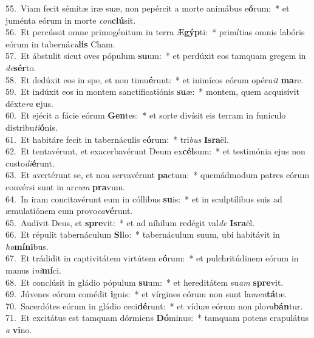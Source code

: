 {55.~}Viam fecit sémitæ iræ suæ, non pepércit a morte animábus e\textbf{ó}rum:~* et juménta eórum in morte \textit{con}\textbf{clú}sit.\\
{56.~}Et percússit omne primogénitum in terra Æ\textbf{gýp}ti:~* primítias omnis labóris eórum in taberná\textit{cu}\textbf{lis} Cham.\\
{57.~}Et ábstulit sicut oves pópulum \textbf{su}um:~* et perdúxit eos tamquam gregem in \textit{de}\textbf{sér}to.\\
{58.~}Et dedúxit eos in spe, et non timu\textbf{é}runt:~* et inimícos eórum opéru\textit{it} \textbf{ma}re.\\
{59.~}Et indúxit eos in montem sanctificatiónis \textbf{su}æ:~* montem, quem acquisívit déxte\textit{ra} \textbf{e}jus.\\
{60.~}Et ejécit a fácie eórum \textbf{Gen}tes:~* et sorte divísit eis terram in funículo distribu\textit{ti}\textbf{ó}nis.\\
{61.~}Et habitáre fecit in tabernáculis e\textbf{ó}rum:~* tri\textit{bus} \textbf{Is}\textbf{ra}ël.\\
{62.~}Et tentavérunt, et exacerbavérunt Deum ex\textbf{cél}sum:~* et testimónia ejus non custo\textit{di}\textbf{é}runt.\\
{63.~}Et avertérunt se, et non servavérunt \textbf{pa}ctum:~* quemádmodum patres eórum convérsi sunt in ar\textit{cum} \textbf{pra}vum.\\
{64.~}In iram concitavérunt eum in cóllibus \textbf{su}is:~* et in sculptílibus suis ad æmulatiónem eum provo\textit{ca}\textbf{vé}runt.\\
{65.~}Audívit Deus, et \textbf{spre}vit:~* et ad níhilum redégit val\textit{de} \textbf{Is}\textbf{ra}ël.\\
{66.~}Et répulit tabernáculum \textbf{Si}lo:~* tabernáculum suum, ubi habitávit in \textit{ho}\textbf{mí}\textbf{ni}bus.\\
{67.~}Et trádidit in captivitátem virtútem e\textbf{ó}rum:~* et pulchritúdinem eórum in manus i\textit{ni}\textbf{mí}ci.\\
{68.~}Et conclúsit in gládio pópulum \textbf{su}um:~* et hereditátem su\textit{am} \textbf{spre}vit.\\
{69.~}Júvenes eórum comédit \textbf{i}gnis:~* et vírgines eórum non sunt la\textit{men}\textbf{tá}tæ.\\
{70.~}Sacerdótes eórum in gládio ceci\textbf{dé}runt:~* et víduæ eórum non plo\textit{ra}\textbf{bán}tur.\\
{71.~}Et excitátus est tamquam dórmiens \textbf{Dó}minus:~* tamquam potens crapulátus \textit{a} \textbf{vi}no.\\
